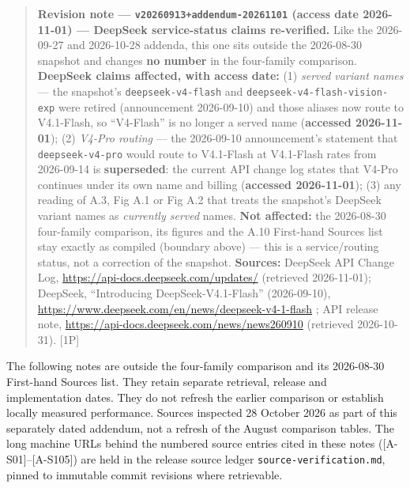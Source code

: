\begin{quote}
\textbf{Revision note --- \texttt{v20260913+addendum-20261101} (access
date 2026-11-01) --- DeepSeek service-status claims re-verified.} Like
the 2026-09-27 and 2026-10-28 addenda, this one sits outside the
2026-08-30 snapshot and changes \textbf{no number} in the four-family
comparison. \textbf{DeepSeek claims affected, with access date:} (1)
\emph{served variant names} --- the snapshot's
\texttt{deepseek-v4-flash} and \texttt{deepseek-v4-flash-vision-exp}
were retired (announcement 2026-09-10) and those aliases now route to
V4.1-Flash, so ``V4-Flash'' is no longer a served name (\textbf{accessed
2026-11-01}); (2) \emph{V4-Pro routing} --- the 2026-09-10
announcement's statement that \texttt{deepseek-v4-pro} would route to
V4.1-Flash at V4.1-Flash rates from 2026-09-14 is \textbf{superseded}:
the current API change log states that V4-Pro continues under its own
name and billing (\textbf{accessed 2026-11-01}); (3) any reading of A.3,
Fig A.1 or Fig A.2 that treats the snapshot's DeepSeek variant names as
\emph{currently served} names. \textbf{Not affected:} the 2026-08-30
four-family comparison, its figures and the A.10 First-hand Sources list
stay exactly as compiled (boundary above) --- this is a service/routing
status, not a correction of the snapshot. \textbf{Sources:} DeepSeek API
Change Log, \url{https://api-docs.deepseek.com/updates/} (retrieved
2026-11-01); DeepSeek, ``Introducing DeepSeek-V4.1-Flash'' (2026-09-10),
\url{https://www.deepseek.com/en/news/deepseek-v4-1-flash} ; API release note,
\url{https://api-docs.deepseek.com/news/news260910} (retrieved 2026-10-31).
\mbox{{[}1P{]}}
\end{quote}

The following notes are outside the four-family comparison and its
2026-08-30 First-hand Sources list. They retain separate retrieval,
release and implementation dates. They do not refresh the earlier
comparison or establish locally measured performance. Sources inspected
28 October 2026 as part of this separately dated addendum, not a refresh
of the August comparison tables. The long machine URLs behind the
numbered source entries cited in these notes (\mbox{{[}A-S01{]}}--\mbox{{[}A-S105{]}})
are held in the release source ledger \texttt{source-verification.md},
pinned to immutable commit revisions where retrievable.

